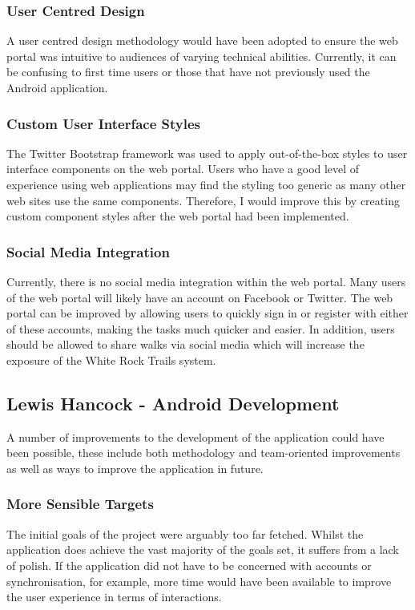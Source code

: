 \documentclass[11pt,a4paper]{report}
\begin{document}
\subsubsection{User Centred Design}
A user centred design methodology would have been adopted to ensure the web portal was intuitive to audiences of varying technical abilities. Currently, it can be confusing to first time users or those that have not previously used the Android application.

\subsubsection{Custom User Interface Styles}
The Twitter Bootstrap framework was used to apply out-of-the-box styles to user interface components on the web portal. Users who have a good level of experience using web applications may find the styling too generic as many other web sites use the same components. Therefore, I would improve this by creating custom component styles after the web portal had been implemented.

\subsubsection{Social Media Integration}
Currently, there is no social media integration within the web portal. Many users of the web portal will likely have an account on Facebook or Twitter. The web portal can be improved by allowing users to quickly sign in or register with either of these accounts, making the tasks much quicker and easier. In addition, users should be allowed to share walks via social media which will increase the exposure of the White Rock Trails system.

\subsection{Lewis Hancock - Android Development}
A number of improvements to the development of the application could have been possible, these include both methodology and team-oriented improvements as well as ways to improve the application in future.

\subsubsection{More Sensible Targets}
The initial goals of the project were arguably too far fetched. Whilst the application does achieve the vast majority of the goals set, it suffers from a lack of polish. If the application did not have to be concerned with accounts or synchronisation, for example, more time would have been available to improve the user experience in terms of interactions.
\end{document}
